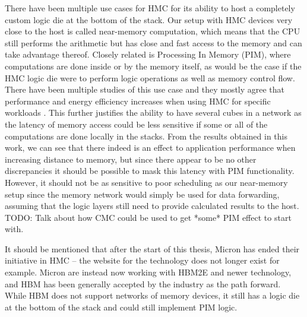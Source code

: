 There have been multiple use cases for HMC for its ability to host a completely custom logic die at the bottom of the stack. Our setup with HMC devices very close to the host is called near-memory computation, which means that the CPU still performs the arithmetic but has close and fast access to the memory and can take advantage thereof. Closely related is Processing In Memory (PIM), where computations are done inside or by the memory itself, as would be the case if the HMC logic die were to perform logic operations as well as memory control flow. There have been multiple studies of this use case and they mostly agree that performance and energy efficiency increases when using HMC for specific workloads \cite{7917248, Min:2019:NEH:3287624.3287642, 7804052, oliveira2017nim}. This further justifies the ability to have several cubes in a network as the latency of memory access could be less sensitive if some or all of the computations are done locally in the stacks. From the results obtained in this work, we can see that there indeed is an effect to application performance when increasing distance to memory, but since there appear to be no other discrepancies it should be possible to mask this latency with PIM functionality. However, it should not be as sensitive to poor scheduling as our near-memory setup since the memory network would simply be used for data forwarding, assuming that the logic layers still need to provide calculated results to the host. TODO: Talk about how CMC could be used to get *some* PIM effect to start with. 
\bigskip

It should be mentioned that after the start of this thesis, Micron has ended their initiative in HMC -- the website for the technology does not longer exist for example. Micron are instead now working with HBM2E and newer technology, and HBM has been generally accepted by the industry as the path forward. While HBM does not support networks of memory devices, it still has a logic die at the bottom of the stack and could still implement PIM logic.
